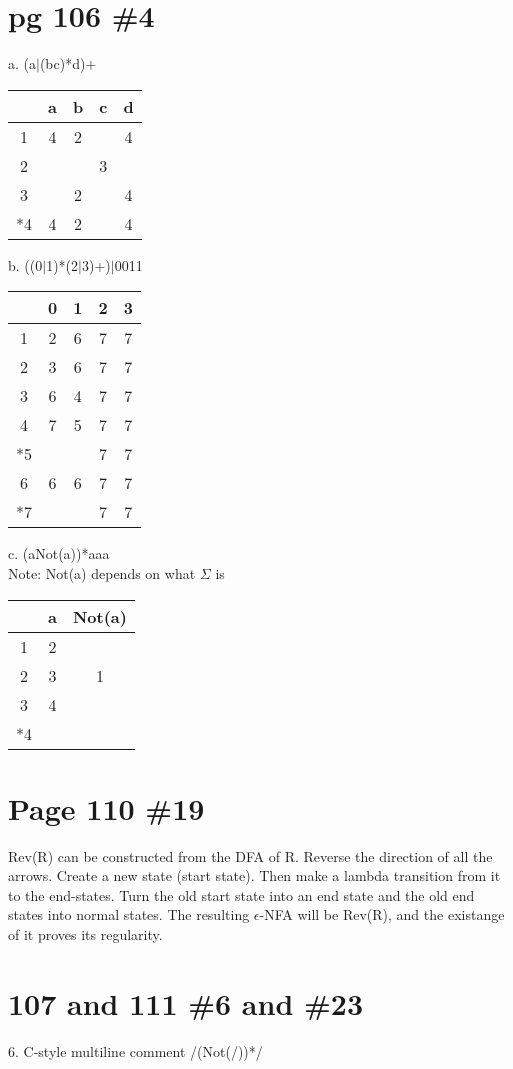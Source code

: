 \documentclass[11pt]{article}
\begin{document}
\section{pg 106 \#4}
    a. (a$\mid$(bc)*d)+ \\
    \begin{tabular}{|c|c|c|c|c|}
  \hline  & a & b & c & d \\ \hline
        1 & 4 & 2 &   & 4 \\ \hline
        2 &   &   & 3 &   \\ \hline
        3 &   & 2 &   & 4 \\ \hline
       *4 & 4 & 2 &   & 4 \\ \hline
    \end{tabular}

    b. ((0$\mid$1)*(2$\mid$3)+)$\mid$0011 \\
    \begin{tabular}{|c|c|c|c|c|}
   \hline & 0 & 1 & 2 & 3 \\ \hline
        1 & 2 & 6 & 7 & 7 \\ \hline
        2 & 3 & 6 & 7 & 7 \\ \hline
        3 & 6 & 4 & 7 & 7 \\ \hline
        4 & 7 & 5 & 7 & 7 \\ \hline
       *5 &   &   & 7 & 7 \\ \hline
        6 & 6 & 6 & 7 & 7 \\ \hline
       *7 &   &   & 7 & 7 \\ \hline
    \end{tabular}

    c. (aNot(a))*aaa \\
        Note: Not(a) depends on what $\Sigma$ is \\
    \begin{tabular}{|c|c|c|}
  \hline  & a & Not(a) \\ \hline
        1 & 2 &   \\ \hline
        2 & 3 & 1 \\ \hline
        3 & 4 &   \\ \hline
       *4 &   &   \\ \hline
    \end{tabular}
\section{Page 110 \#19}
    Rev(R) can be constructed from the DFA of R.
    Reverse the direction of all the arrows.
    Create a new state (start state). Then make a lambda transition from it to the end-states.
    Turn the old start state into an end state and the old end states into normal states.
    The resulting $\epsilon$-NFA will be Rev(R), and the existange of it proves its regularity.

\section{107 and 111 \#6 and \#23}
    6. C-style multiline comment
    /\*(\*Not(/))*\*/
\end{document}
